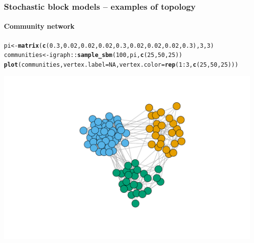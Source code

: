 \documentclass{beamer}\usepackage[]{graphicx}\usepackage[]{color}
\makeatletter
\newcommand{\hlnum}[1]{\textcolor[rgb]{0.686,0.059,0.569}{#1}}%
\newcommand{\hlopt}[1]{\textcolor[rgb]{0,0,0}{#1}}%
\newcommand{\hlstd}[1]{\textcolor[rgb]{0.345,0.345,0.345}{#1}}%
\newcommand{\hlkwb}[1]{\textcolor[rgb]{0.69,0.353,0.396}{#1}}%
\newcommand{\hlkwc}[1]{\textcolor[rgb]{0.333,0.667,0.333}{#1}}%
\newcommand{\hlkwd}[1]{\textcolor[rgb]{0.737,0.353,0.396}{\textbf{#1}}}%
\newenvironment{kframe}{%
 \def\at@end@of@kframe{}%
 \ifinner\ifhmode%
  \def\at@end@of@kframe{\end{minipage}}%
  \begin{minipage}{\columnwidth}%
 \fi\fi%
 \def\FrameCommand##1{\hskip\@totalleftmargin \hskip-\fboxsep
 \colorbox{shadecolor}{##1}\hskip-\fboxsep
     \hskip-\linewidth \hskip-\@totalleftmargin \hskip\columnwidth}%
 \MakeFramed {\advance\hsize-\width
   \@totalleftmargin\z@ \linewidth\hsize
   \@setminipage}}%
 {\par\unskip\endMakeFramed%
 \at@end@of@kframe}
\newenvironment{knitrout}{}{} %
\makeatother
\begin{document}
\begin{frame}[fragile]
  \frametitle{Stochastic block models -- examples of topology}
  \framesubtitle{Community network}

\begin{knitrout}\scriptsize
{}\color{fgcolor}\begin{kframe}
\begin{alltt}
\hlstd{pi} \hlkwb{<-} \hlkwd{matrix}\hlstd{(}\hlkwd{c}\hlstd{(}\hlnum{0.3}\hlstd{,}\hlnum{0.02}\hlstd{,}\hlnum{0.02}\hlstd{,}\hlnum{0.02}\hlstd{,}\hlnum{0.3}\hlstd{,}\hlnum{0.02}\hlstd{,}\hlnum{0.02}\hlstd{,}\hlnum{0.02}\hlstd{,}\hlnum{0.3}\hlstd{),}\hlnum{3}\hlstd{,}\hlnum{3}\hlstd{)}
\hlstd{communities} \hlkwb{<-} \hlstd{igraph}\hlopt{::}\hlkwd{sample_sbm}\hlstd{(}\hlnum{100}\hlstd{, pi,} \hlkwd{c}\hlstd{(}\hlnum{25}\hlstd{,} \hlnum{50}\hlstd{,} \hlnum{25}\hlstd{))}
\hlkwd{plot}\hlstd{(communities,} \hlkwc{vertex.label}\hlstd{=}\hlnum{NA}\hlstd{,} \hlkwc{vertex.color} \hlstd{=} \hlkwd{rep}\hlstd{(}\hlnum{1}\hlopt{:}\hlnum{3}\hlstd{,}\hlkwd{c}\hlstd{(}\hlnum{25}\hlstd{,} \hlnum{50}\hlstd{,} \hlnum{25}\hlstd{)))}
\end{alltt}
\end{kframe}
\includegraphics[width=.8\textwidth]{figures/unnamed-chunk-6-1} 

\end{knitrout}

\end{frame}
\end{document}
